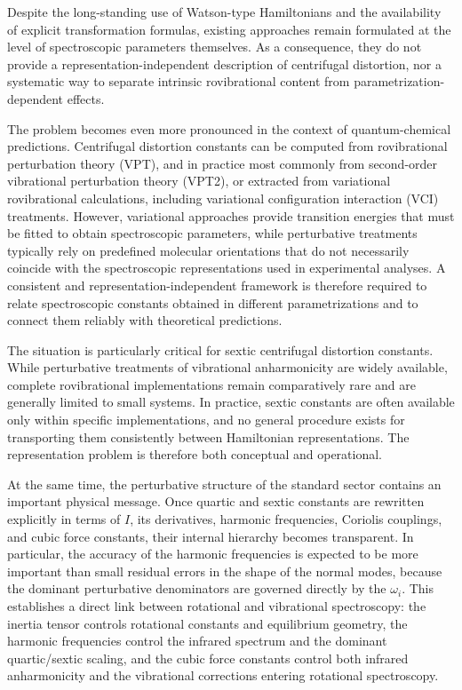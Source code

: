 \documentclass[aip,jcp,reprint,floatfix]{revtex4-2}
\begin{document}
Despite the long-standing use of Watson-type Hamiltonians and the
availability of explicit transformation formulas, existing approaches
remain formulated at the level of spectroscopic parameters themselves.
\cite{Watson1968,Watson1977,AlievWatson1976,PapousekAliev1982,Aliev1986}
As a consequence, they do not provide a representation-independent
description of centrifugal distortion, nor a systematic way to separate
intrinsic rovibrational content from parametrization-dependent effects.

The problem becomes even more pronounced in the context of
quantum-chemical predictions. Centrifugal distortion constants can be
computed from rovibrational perturbation theory (VPT), and in practice
most commonly from second-order vibrational perturbation theory
(VPT2),
\cite{Franke2021}
or extracted from variational rovibrational calculations, including
variational configuration interaction (VCI) treatments.
\cite{Dinu2022,BowmanCarterHuang2003,MatyusCzakoCsaszar2009,
JensenBunker2000,BunkerJensen2005}
However, variational approaches provide transition energies that must
be fitted to obtain spectroscopic parameters, while perturbative
treatments typically rely on predefined molecular orientations that do
not necessarily coincide with the spectroscopic representations used in
experimental analyses. A consistent and representation-independent
framework is therefore required to relate spectroscopic constants
obtained in different parametrizations and to connect them reliably
with theoretical predictions.

The situation is particularly critical for sextic centrifugal
distortion constants. While perturbative treatments of vibrational
anharmonicity are widely available, complete rovibrational
implementations remain comparatively rare and are generally limited to
small systems.
\cite{BowmanCarterHuang2003,MatyusCzakoCsaszar2009,
Jensen1988MORBID,JensenBunker2000,BunkerJensen2005}
In practice, sextic constants are often available only within specific
implementations, and no general procedure exists for transporting them
consistently between Hamiltonian representations. The representation
problem is therefore both conceptual and operational.

At the same time, the perturbative structure of the standard sector
contains an important physical message. Once quartic and sextic
constants are rewritten explicitly in terms of $I$, its derivatives,
harmonic frequencies, Coriolis couplings, and cubic force constants,
their internal hierarchy becomes transparent. In particular, the
accuracy of the harmonic frequencies is expected to be more important
than small residual errors in the shape of the normal modes, because
the dominant perturbative denominators are governed directly by the
\(\omega_i\). This establishes a direct link between rotational and
vibrational spectroscopy: the inertia tensor controls rotational
constants and equilibrium geometry, the harmonic frequencies control
the infrared spectrum and the dominant quartic/sextic scaling, and the
cubic force constants control both infrared anharmonicity and the
vibrational corrections entering rotational spectroscopy.
\end{document}
